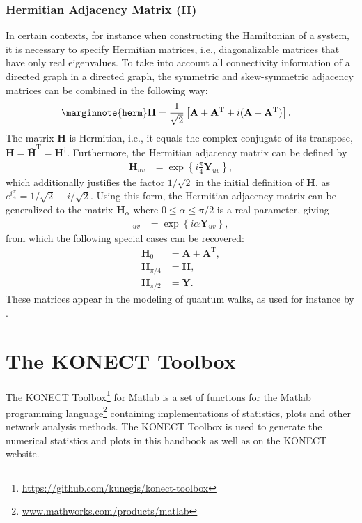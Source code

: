 \documentclass{article}
\begin{document}
\subsubsection{Hermitian Adjacency Matrix ($\mathbf H$)}
In certain contexts, for instance when constructing the Hamiltonian of a
system, it is necessary to specify Hermitian matrices, i.e.,
diagonalizable matrices that have only real eigenvalues.  To take into
account all connectivity information of a directed graph in a
directed graph, the symmetric and skew-symmetric adjacency matrices can
be combined in the following way:
\begin{align}
  \marginnote{\texttt{herm}}
  \mathbf H &= \frac 1 {\sqrt 2} \left[
  \mathbf A + \mathbf A^{\mathrm T} + i(\mathbf A - \mathbf A^{\mathrm T})
  \right]. 
\end{align}
The matrix $\mathbf H$ is Hermitian, i.e., it equals the complex
conjugate of its transpose, $\mathbf H = \mathbf {\bar H}^{\mathrm T} =
\mathbf H^{\dagger}$.
Furthermore, the Hermitian adjacency matrix can be defined by
\begin{align}
  \mathbf H_{uv} &= \exp\left\{i \frac \pi 4 \mathbf Y_{uv}\right\},
\end{align}
which additionally justifies the factor $1/\sqrt 2$ in the initial
definition of $\mathbf H$, as $e^{i \frac \pi 4} = 1/\sqrt 2 + i/\sqrt
2$.  Using this form, the Hermitian adjacency matrix can be generalized
to the matrix $\mathbf H_\alpha$ where $0 \leq \alpha \leq \pi/2$ is a
real parameter, giving 
\begin{align}
  [\mathbf H_{\alpha}]_{uv} &= \exp\left\{i \alpha \mathbf Y_{uv} \right\},  
\end{align}
from which the following special cases can be recovered:
\begin{align}
  \mathbf H_0 &= \mathbf A + \mathbf A^{\mathrm T}, \\
  \mathbf H_{\pi/4} &= \mathbf H, \\
  \mathbf H_{\pi/2} &= \mathbf Y.
\end{align}
These matrices appear in the modeling of quantum walks, as used for
instance by \cite{toedtli:ctqw}.  

\section{The KONECT Toolbox}
\label{sec:toolbox}
The KONECT
Toolbox\footnote{\href{https://github.com/kunegis/konect-toolbox}{https://github.com/kunegis/konect-toolbox}}
for Matlab is a set of functions for the Matlab programming
language\footnote{\href{http://www.mathworks.com/products/matlab/}{www.mathworks.com/products/matlab}}
containing implementations of statistics, plots and other network
analysis methods.  The KONECT Toolbox is used to generate the numerical
statistics and plots in this handbook as well as on the KONECT website.
\end{document}
